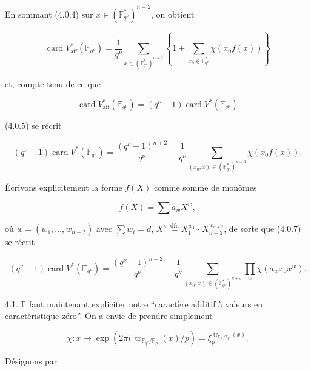 En sommant (4.0.4) sur $x\in(\mathbb F_{q^\nu}^*)^{n+2}$, on obtient

\begin{equation}\tag{4.0.5}
\operatorname{card}V^*_{\mathrm{aff}}(\mathbb F_{q^\nu})
=\frac1{q^\nu}
\sum_{x\in(\mathbb F_{q^\nu}^*)^{n+2}}
\left\{1+\sum_{x_0\in\mathbb F_{q^\nu}^*}\chi(x_0f(x))\right\}
\end{equation}

et, compte tenu de ce que

\begin{equation}\tag{4.0.6}
\operatorname{card}V^*_{\mathrm{aff}}(\mathbb F_{q^\nu})
=(q^\nu-1)\operatorname{card}V^*(\mathbb F_{q^\nu})
\end{equation}

(4.0.5) se récrit

\begin{equation}\tag{4.0.7}
(q^\nu-1)\operatorname{card}V^*(\mathbb F_{q^\nu})
=\frac{(q^\nu-1)^{n+2}}{q^\nu}
+\frac1{q^\nu}
\sum_{(x_0,x)\in(\mathbb F_{q^\nu}^*)^{n+3}}\chi(x_0f(x)).
\end{equation}

Écrivons explicitement la forme $f(X)$ comme somme de monômes

\begin{equation}\tag{4.0.8}
f(X)=\sum a_wX^w,
\end{equation}

où $w=(w_1,\ldots,w_{n+2})$ avec $\sum w_i=d$,
$X^w\overset{\mathrm{dfn}}{=}X_1^{w_1}\cdots X_{n+2}^{w_{n+2}}$, de sorte
que (4.0.7) se récrit

\begin{equation}\tag{4.0.9}
(q^\nu-1)\operatorname{card}V^*(\mathbb F_{q^\nu})
=\frac{(q^\nu-1)^{n+2}}{q^\nu}
+\frac1{q^\nu}
\sum_{(x_0,x)\in(\mathbb F_{q^\nu}^*)^{n+3}}
\prod_w\chi(a_wx_0x^w).
\end{equation}

4.1. Il faut maintenant expliciter notre ``caractère additif à valeurs en
caractéristique zéro''. On a envie de prendre simplement

\begin{equation}\tag{4.1.0}
\chi:x\longmapsto
\exp\!\left(2\pi i\,\operatorname{tr}_{\mathbb F_{q^\nu}/\mathbb F_p}(x)/p\right)
=\xi_p^{\operatorname{tr}_{\mathbb F_{q^\nu}/\mathbb F_p}(x)}.
\end{equation}


Désignons par

